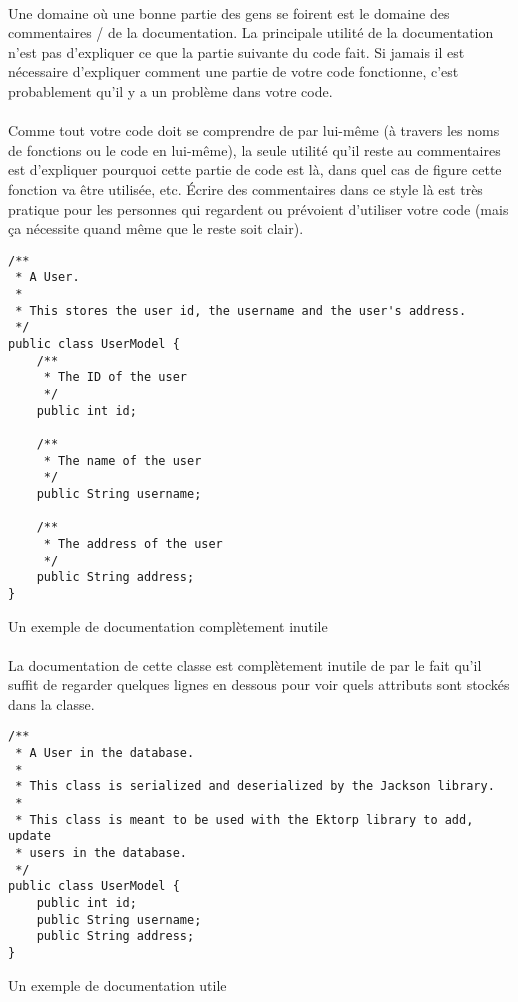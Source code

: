 \paragraph{} Une domaine où une bonne partie des gens se foirent est le domaine
des commentaires / de la documentation. La principale utilité de la
documentation n'est pas d'expliquer ce que la partie suivante du code fait. Si
jamais il est nécessaire d'expliquer comment une partie de votre code
fonctionne, c'est probablement qu'il y a un problème dans votre code.

\paragraph{} Comme tout votre code doit se comprendre de par lui-même (à
travers les noms de fonctions ou le code en lui-même), la seule utilité qu'il
reste au commentaires est d'expliquer pourquoi cette partie de code est là,
dans quel cas de figure cette fonction va être utilisée, etc. Écrire des
commentaires dans ce style là est très pratique pour les personnes qui
regardent ou prévoient d'utiliser votre code (mais ça nécessite quand même que
le reste soit clair).

\begin{listing}[H]
	\centering
	\begin{verbatim}
/**
 * A User.
 *
 * This stores the user id, the username and the user's address.
 */
public class UserModel {
	/**
	 * The ID of the user
	 */
	public int id;

	/**
	 * The name of the user
	 */
	public String username;

	/**
	 * The address of the user
	 */
	public String address;
}
	\end{verbatim}
	\caption{Un exemple de documentation complètement inutile}
\end{listing}

\paragraph{} La documentation de cette classe est complètement inutile de par
le fait qu'il suffit de regarder quelques lignes en dessous pour voir quels
attributs sont stockés dans la classe.

\begin{listing}[H]
	\centering
	\begin{verbatim}
/**
 * A User in the database.
 *
 * This class is serialized and deserialized by the Jackson library.
 *
 * This class is meant to be used with the Ektorp library to add, update
 * users in the database.
 */
public class UserModel {
	public int id;
	public String username;
	public String address;
}
	\end{verbatim}
	\caption{Un exemple de documentation utile}
\end{listing}
